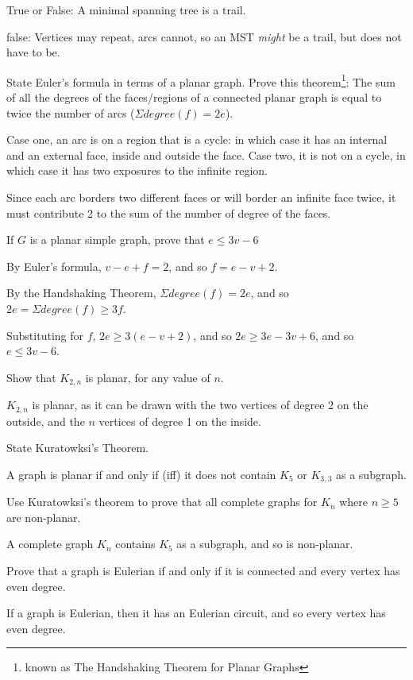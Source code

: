 \documentclass[a4paper,10pt]{exam}
\begin{document}
\begin{questions}
    \question True or False: A minimal spanning tree is a trail.
    \begin{solution}
        false: Vertices may repeat, arcs cannot, so an MST \emph{might} be a trail, but does not have to be. 
    \end{solution}
    \question State Euler's formula in terms of a planar graph. 
    \question Prove this theorem\footnote{known as The Handshaking Theorem for Planar Graphs}: The sum of all the degrees of the faces/regions of a connected planar graph is equal to twice the number of arcs ($\Sigma degree(f) = 2e$). 
    \begin{solution}
        Case one, an arc is on a region that is a cycle: in which case it has an internal and an external face, inside and outside the face. 
        Case two, it is not on a cycle, in which case it has two exposures to the infinite region. 

        Since each arc borders two different faces or will border an infinite face twice, it must contribute 2 to the sum of the number of degree of the faces. 
    \end{solution}
    \question If $G$ is a planar simple graph, prove that $e \le 3v - 6$
    \begin{solution}
        By Euler's formula, $v - e + f = 2$, and so $f = e - v + 2$. 

        By the Handshaking Theorem, $\Sigma degree(f) = 2e$, and so $2e = \Sigma degree(f) \ge 3f$. 

        Substituting for $f$, $2e \ge 3(e - v + 2)$, and so $2e \ge 3e - 3v + 6$, and so $e \le 3v - 6$.
    \end{solution}
    \question Show that $K_{2,n}$ is planar, for any value of $n$.
    \begin{solution}
        $K_{2,n}$ is planar, as it can be drawn with the two vertices of degree 2 on the outside, and the $n$ vertices of degree 1 on the inside.
    \end{solution}
    \question State Kuratowksi's Theorem. 
    \begin{solution}
        A graph is planar if and only if (iff) it does not contain $K_5$ or $K_{3,3}$ as a subgraph. 
    \end{solution}
    \question Use Kuratowksi's theorem to prove that all complete graphs for $K_n$ where $n \ge 5$ are non-planar. 
    \begin{solution}
        A complete graph $K_n$ contains $K_5$ as a subgraph, and so is non-planar.
    \end{solution}
    \question Prove that a graph is Eulerian if and only if it is connected and every vertex has even degree.
    \begin{solution}
        If a graph is Eulerian, then it has an Eulerian circuit, and so every vertex has even degree. 


\end{solution}
\end{questions}
\end{document}
